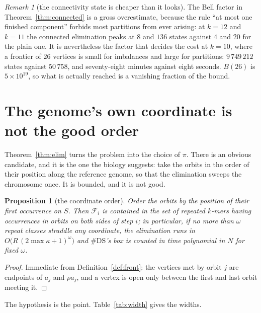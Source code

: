 \documentclass[11pt]{article}
\theoremstyle{plain}
\newtheorem{proposition}[theorem]{Proposition}
\theoremstyle{definition}
\theoremstyle{remark}
\newtheorem{remark}[theorem]{Remark}
\newcommand{\DS}{\mathrm{DS}}
\newcommand{\Fr}{\mathcal{F}}
\begin{document}
\begin{remark}[the connectivity state is cheaper than it looks]\label{rem:bell}
The Bell factor in Theorem~\ref{thm:connected} is a gross overestimate, because the rule
``at most one finished component'' forbids most partitions from ever arising: at $k=12$ and
$k=11$ the connected elimination peaks at $8$ and $136$ states against $4$ and $20$ for the
plain one. It is nevertheless the factor that decides the cost at $k=10$, where a frontier of
$26$ vertices is small for imbalances and large for partitions: $9\,749\,212$ states against
$50\,758$, and seventy-eight minutes against eight seconds. $B(26)$ is $5\times10^{19}$, so
what is actually reached is a vanishing fraction of the bound.
\end{remark}

\section{The genome's own coordinate is not the good order}\label{sec:width}

Theorem~\ref{thm:elim} turns the problem into the choice of $\pi$. There is an obvious
candidate, and it is the one the biology suggests: take the orbits in the order of their
position along the reference genome, so that the elimination sweeps the chromosome once. It
is bounded, and it is not good.

\begin{proposition}[the coordinate order]\label{prop:coord}
Order the orbits by the position of their first occurrence on $S$. Then $\Fr_i$ is contained
in the set of repeated $k$-mers having occurrences in orbits on both sides of step $i$; in
particular, if no more than $\omega$ repeat classes straddle any coordinate, the elimination
runs in $O\big(R\,(2\max\kappa+1)^{\omega}\big)$ and $\#\DS$'s box is counted in time
polynomial in $N$ for fixed $\omega$.
\end{proposition}

\begin{proof}
Immediate from Definition~\ref{def:front}: the vertices met by orbit $j$ are endpoints of
$a_j$ and $\rho a_j$, and a vertex is open only between the first and last orbit meeting it.
\end{proof}

The hypothesis is the point. Table~\ref{tab:width} gives the widths.
\end{document}
